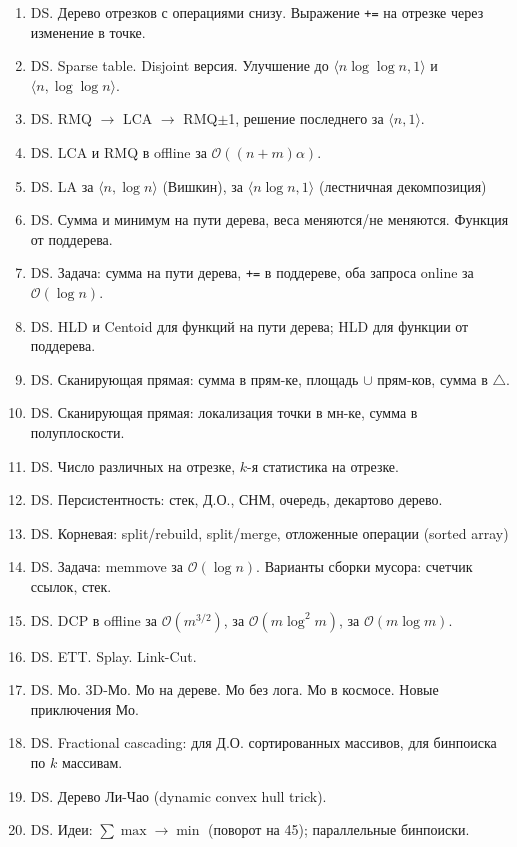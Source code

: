 \documentclass[11pt]{article}
\def\t{\texttt}          %
\def\O{\mathcal{O}}      %
\newcommand{\q}[1]{\langle #1 \rangle}               %
\newcounter{myenumi}
\newenvironment{MyList}{
  \begin{enumerate}[1.]
  \setlength{\parskip}{0pt}
  \setlength{\itemsep}{2pt}
  \setcounter{enumi}{\arabic{myenumi}}
}{
  \setcounter{myenumi}{\arabic{enumi}}
  \end{enumerate}
}
\newlength{\ShiftLength}\setlength{\ShiftLength}{2.3em}
\newcommand{\leftLabel}[2][]{%
  \ifthenelse{\equal{#1}{}}{%
    {\hspace*{-\ShiftLength}\makebox[0pt][r]{\color{black}{#2}}\hspace*{\ShiftLength}}%
  }{%
    {\hspace*{-\ShiftLength}\makebox[0pt][r]{\color{#1}{#2}}\hspace*{\ShiftLength}}%
  }%
}
\def\Easy{\leftLabel[dkgreen]{$(a)$}}
\begin{document}
\begin{MyList}
\item DS. Дерево отрезков с операциями снизу. Выражение \t{+=} на отрезке через изменение в точке.
\item DS. Sparse table. Disjoint версия. Улучшение до $\q{n \log\log n, 1}$ и $\q{n, \log\log n}$.
\item DS. RMQ $\to$ LCA $\to$ RMQ{$\pm$}1, решение последнего за $\q{n, 1}$.
\item DS. LCA и RMQ в offline за $\O((n+m)\alpha)$.
\item DS. LA за $\q{n, \log n}$ (Вишкин), за $\q{n \log n, 1}$ (лестничная декомпозиция)
\item DS. Сумма и минимум на пути дерева, веса меняются/не меняются. Функция от поддерева.
\item DS. Задача: сумма на пути дерева, \t{+=} в поддереве, оба запроса online за $\O(\log n)$.
\item DS. HLD и Centoid для функций на пути дерева; HLD для функции от поддерева.
\item DS. Сканирующая прямая: сумма в прям-ке, площадь $\cup$ прям-ков, сумма в $\triangle$.
\item DS. Сканирующая прямая: локализация точки в мн-ке, сумма в полуплоскости.
\item DS. Число различных на отрезке, $k$-я статистика на отрезке.
\item DS. Персистентность: стек, Д.О., СНМ, очередь, декартово дерево.
\item DS. Корневая: split/rebuild, split/merge, отложенные операции (sorted array)
\item DS. Задача: memmove за $\O(\log n)$. Варианты сборки мусора: счетчик ссылок, стек.
\item DS. DCP в offline за $\O(m^{3/2})$, за $\O(m \log^2 m)$, за $\O(m \log m)$.
\item DS. ETT. Splay. Link-Cut.
\item DS. Мо. 3D-Мо. Мо на дереве. Мо без лога. Мо в космосе. Новые приключения Мо.
\item DS. Fractional cascading: для Д.О. сортированных массивов, для бинпоиска по $k$ массивам.
\item DS. Дерево Ли-Чао (dynamic convex hull trick).
\item DS. Идеи: $\sum\max \to \min$ (поворот на 45); параллельные бинпоиски.

\end{MyList}
\end{document}
